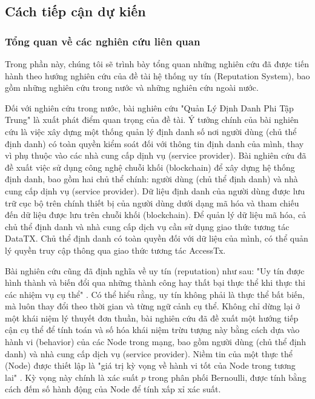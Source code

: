 \subsection*{\thesubsection\quad Cách tiếp cận dự kiến}

\subsubsection*{\thesubsubsection\quad Tổng quan về các nghiên cứu liên quan}
Trong phần này, chúng tôi sẽ trình bày tổng quan những nghiên cứu đã được tiến hành theo hướng nghiên cứu của đề tài hệ thống uy tín (Reputation System), bao gồm những nghiên cứu trong nước và những nghiên cứu ngoài nước.
\par

Đối với nghiên cứu trong nước, bài nghiên cứu "Quản Lý Định Danh Phi Tập Trung" \cite{quan-ly-dinh-danh-phi-tap-trung} là xuất phát điểm quan trọng của đề tài. Ý tưởng chính của bài nghiên cứu là việc xây dựng một thống quản lý định danh số nơi người dùng (chủ thể định danh) có toàn quyền kiểm soát đối với thông tin định danh của mình, thay vì phụ thuộc vào các nhà cung cấp dịnh vụ (service provider). Bài nghiên cứu đã đề xuất việc sử dụng công nghệ chuỗi khối (blockchain) để xây dựng hệ thống định danh, bao gồm hai chủ thể chính: người dùng (chủ thể định danh) và nhà cung cấp dịnh vụ (service provider). Dữ liệu định danh của người dùng được lưu trữ cục bộ trên chính thiết bị của người dùng dưới dạng mã hóa và tham chiếu đến dữ liệu được lưu trên chuỗi khối (blockchain). Để quản lý dữ liệu mã hóa, cả chủ thể định danh và nhà cung cấp dịch vụ cần sử dụng giao thức tương tác DataTX. Chủ thể định danh có toàn quyền đối với dữ liệu của mình, có thể quản lý quyền truy cập thông qua giao thức tương tác AccessTx.
\par
Bài nghiên cứu cũng đã định nghĩa về uy tín (reputation) như sau: "Uy tín được hình thành và biến đổi qua những thành công hay thất bại thực thể khi thực thi các nhiệm vụ cụ thể" \cite{quan-ly-dinh-danh-phi-tap-trung,a-survey-of-trust-in-internet-applications}. Có thể hiểu rằng, uy tín không phải là thực thể bất biến, mà luôn thay đổi theo thời gian và từng ngữ cảnh cụ thể. Không chỉ dừng lại ở một khái niệm lý thuyết đơn thuần, bài nghiên cứu đã đề xuất một hướng tiếp cận cụ thể để tính toán và số hóa khái niệm trừu tượng này bằng cách dựa vào hành vi (behavior) của các Node trong mạng, bao gồm người dùng (chủ thể định danh) và nhà cung cấp dịch vụ (service provider). Niềm tin của một thực thể (Node) được thiết lập là "giá trị kỳ vọng về hành vi tốt của Node trong tương lai" \cite{quan-ly-dinh-danh-phi-tap-trung}. Kỳ vọng này chính là xác suất \(p\) trong phân phối Bernoulli, được tính bằng cách đếm số hành động của Node để tính xấp xỉ xác suất. \cite{thong-ke-may-tinh,quan-ly-dinh-danh-phi-tap-trung}
\par

